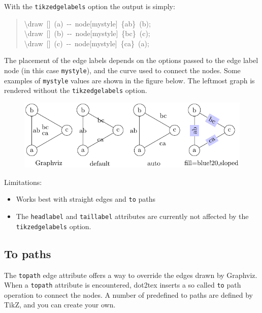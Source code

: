 \documentclass[10pt,a4paper,english]{article}
\begin{document}
With the \texttt{tikzedgelabels} option the output is simply:
\begin{quote}{\ttfamily \raggedright \noindent
{\textbackslash}draw~{[}{]}~(a)~-{}-~node{[}mystyle{]}~{\{}ab{\}}~(b);~\\
{\textbackslash}draw~{[}{]}~(b)~-{}-~node{[}mystyle{]}~{\{}bc{\}}~(c);~\\
{\textbackslash}draw~{[}{]}~(c)~-{}-~node{[}mystyle{]}~{\{}ca{\}}~(a);
}\end{quote}

The placement of the edge labels depends on the options passed to the edge label node (in this case \texttt{mystyle}), and the curve used to connect the nodes. Some examples of \texttt{mystyle} values are shown in the figure below. The leftmost graph is rendered without the \texttt{tikzedgelabels} option.
\begin{figure}[H]
\centering

\includegraphics{pdf/tikzedgelabels}
\end{figure}

Limitations:
\begin{itemize}
\item {} 
Works best with straight edges and \texttt{to} paths

\item {} 
The \texttt{headlabel} and \texttt{taillabel} attributes are currently not affected by the \texttt{tikzedgelabels} option.

\end{itemize}



\hypertarget{to-paths}{}
\subsection*{To paths}
\label{to-paths}

The \texttt{topath} edge attribute offers a way to override the edges drawn by Graphviz. When a \texttt{topath} attribute is encountered, dot2tex inserts a so called \texttt{to} path operation to connect the nodes. A number of predefined to paths are defined by TikZ, and you can create your own.
\end{document}
